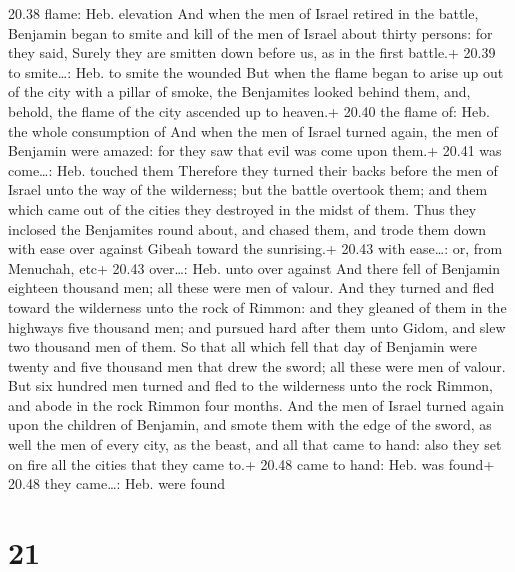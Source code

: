 20.38 flame: Heb. elevation  And when the men of Israel
retired in the battle, Benjamin began to smite and kill of the men of
Israel about thirty persons: for they said, Surely they are smitten down
before us, as in the first battle.+ 20.39 to smite\ldots: Heb. to smite
the wounded  But when the flame began to arise up out of
the city with a pillar of smoke, the Benjamites looked behind them, and,
behold, the flame of the city ascended up to heaven.+ 20.40 the flame
of: Heb. the whole consumption of  And when the men of
Israel turned again, the men of Benjamin were amazed: for they saw that
evil was come upon them.+ 20.41 was come\ldots: Heb. touched them
 Therefore they turned their backs before the men of Israel
unto the way of the wilderness; but the battle overtook them; and them
which came out of the cities they destroyed in the midst of them.
 Thus they inclosed the Benjamites round about, and chased
them, and trode them down with ease over against Gibeah toward the
sunrising.+ 20.43 with ease\ldots: or, from Menuchah, etc+ 20.43
over\ldots: Heb. unto over against  And there fell of
Benjamin eighteen thousand men; all these were men of valour.
 And they turned and fled toward the wilderness unto the
rock of Rimmon: and they gleaned of them in the highways five thousand
men; and pursued hard after them unto Gidom, and slew two thousand men
of them.  So that all which fell that day of Benjamin were
twenty and five thousand men that drew the sword; all these were men of
valour.  But six hundred men turned and fled to the
wilderness unto the rock Rimmon, and abode in the rock Rimmon four
months.  And the men of Israel turned again upon the
children of Benjamin, and smote them with the edge of the sword, as well
the men of every city, as the beast, and all that came to hand: also
they set on fire all the cities that they came to.+ 20.48 came to hand:
Heb. was found+ 20.48 they came\ldots: Heb. were found

\hypertarget{section-20}{%
\section{21}\label{section-20}}

